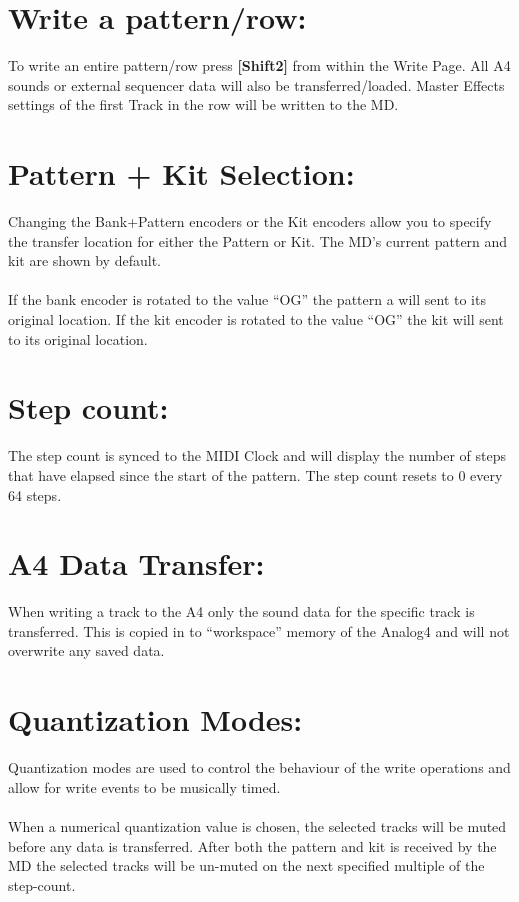 \section{Write a pattern/row:}
To write an entire pattern/row press \textbf{[Shift2]} from within the Write Page.
All A4 sounds or external sequencer data will also be transferred/loaded.
Master Effects settings of the first Track in the row will be written to the MD.

\section{Pattern + Kit Selection:}
Changing the Bank+Pattern encoders or the Kit encoders allow you to specify the transfer location for either the Pattern or Kit. The MD’s current pattern and kit are shown by default.
\\
\\If the bank encoder is rotated to the value “OG” the pattern a will sent to its original location. If the kit encoder is rotated to the value “OG” the kit will sent to its original location.
\section{Step count:}
The step count is synced to the MIDI Clock and will display the number of steps
that have elapsed since the start of the pattern. The step count resets to 0 every 64 steps.

\section{A4 Data Transfer:}
When writing a track to the A4 only the sound data for the specific track is transferred. This is copied in to “workspace” memory of the Analog4 and will not overwrite any saved data.

\section{Quantization Modes:}
Quantization modes are used to control the behaviour of the write operations and allow for write events to be musically timed.\\
\\
When a numerical quantization value is chosen, the selected tracks will be muted before any data is transferred. After both the pattern and kit is received by the MD the selected tracks will be un-muted on the next specified multiple of the step-count.

